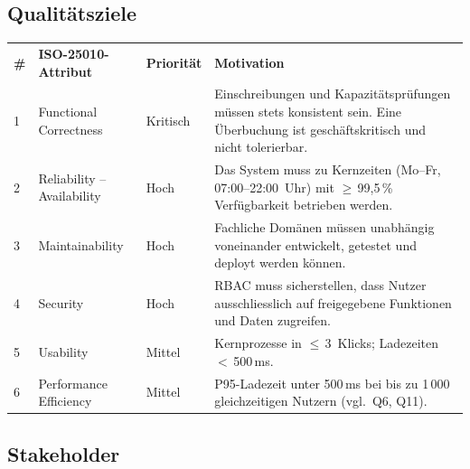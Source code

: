 \subsection{Qualitätsziele}

\begin{tabularx}{\textwidth}{C{0.5cm} L{4.5cm} C{1.8cm} X}
  \color{white}\textbf{\#} & \color{white}\textbf{ISO-25010-Attribut\footnotemark} & \color{white}\textbf{Priorität} & \color{white}\textbf{Motivation} \\
  1 & Functional Correctness & Kritisch & Einschreibungen und Kapazitätsprüfungen müssen stets konsistent sein. Eine Überbuchung ist geschäftskritisch und nicht tolerierbar. \\
  2 & Reliability -- Availability & Hoch & Das System muss zu Kernzeiten (Mo--Fr, 07:00--22:00~Uhr) mit $\geq$\,99,5\,\% Verfügbarkeit betrieben werden. \\
  3 & Maintainability & Hoch & Fachliche Domänen müssen unabhängig voneinander entwickelt, getestet und deployt werden können. \\
  4 & Security & Hoch & RBAC muss sicherstellen, dass Nutzer ausschliesslich auf freigegebene Funktionen und Daten zugreifen. \\
  5 & Usability & Mittel & Kernprozesse in $\leq$\,3~Klicks; Ladezeiten $<$\,500\,ms. \\
  6 & Performance Efficiency & Mittel & P95-Ladezeit unter 500\,ms bei bis zu 1\,000 gleichzeitigen Nutzern (vgl.\ Q6, Q11). \\
\end{tabularx}




\subsection{Stakeholder}

